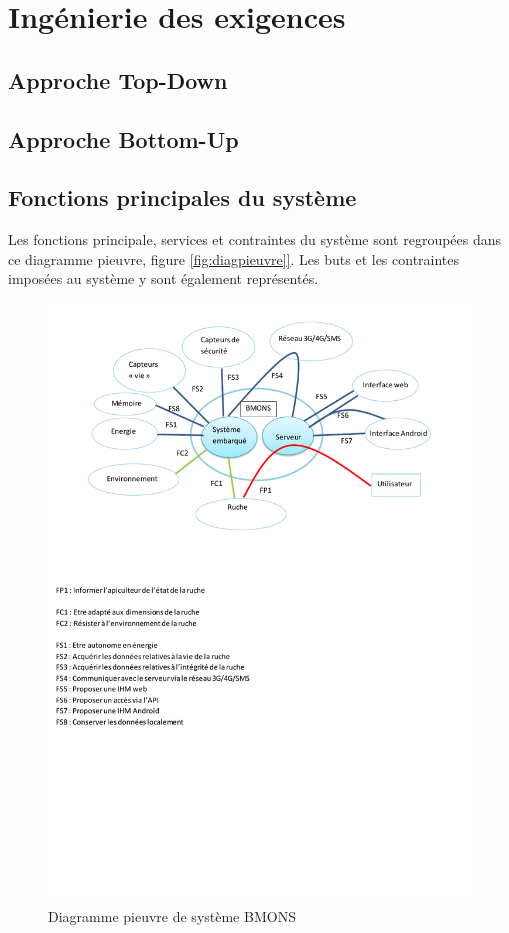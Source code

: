 \chapter{Ingénierie des exigences}
\section{Approche Top-Down}
\label{sec:top-down}

\section{Approche Bottom-Up}

\section{Fonctions principales du système}

Les fonctions principale, services et contraintes du système sont regroupées dans ce diagramme pieuvre, figure \ref{fig:diagpieuvre]}. Les buts et les contraintes imposées au système y sont également représentés. 
 
\begin{figure}[h]
\centering\includegraphics[scale=0.7]{diagpieuvre.pdf}
\caption{\label{fig:diagpieuvre} Diagramme pieuvre de système BMONS}
\end{figure}



